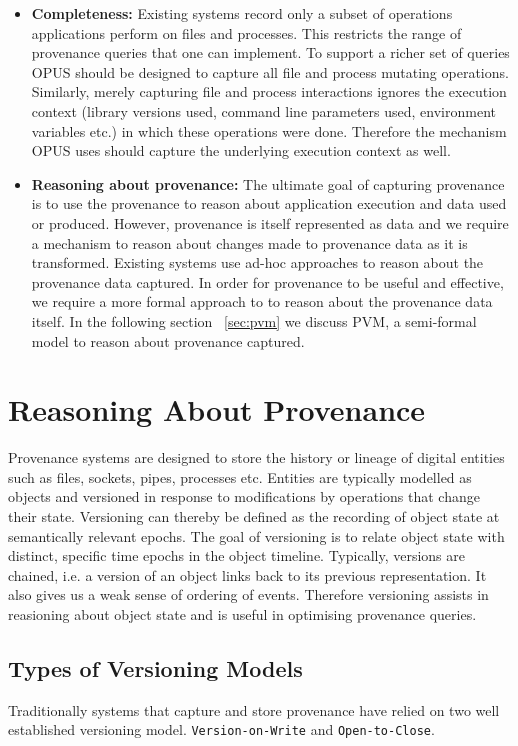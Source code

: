 \documentclass[withindex,glossary]{cam-thesis}
\begin{document}
\begin{itemize}
\item \textbf{Completeness:} 
Existing systems record only a subset of operations applications perform on files and processes. This restricts the range of provenance queries that one can implement. To support a richer set of queries OPUS should be designed to capture all file and process mutating operations. Similarly, merely capturing file and process interactions ignores the execution context (library versions used, command line parameters used, environment variables etc.) in which these operations were done. Therefore the mechanism OPUS uses should capture the underlying execution context as well. 

\item \textbf{Reasoning about provenance:}
The ultimate goal of capturing provenance is to use the provenance to reason about application execution and data used or produced. However, provenance is itself represented as data and we require a mechanism to reason about changes made to provenance data as it is transformed. Existing systems use ad-hoc approaches to reason about the provenance data captured. In order for provenance to be useful and effective, we require a more formal approach to to reason about the provenance data itself. In the following section ~\ref{sec:pvm} we discuss PVM, a semi-formal model to reason about provenance captured.

\end{itemize}

\section{Reasoning About Provenance}
Provenance systems are designed to store the history or lineage of digital entities such as files, sockets, pipes, processes etc.
Entities are typically modelled as objects and versioned in response to modifications by operations that change their state.
Versioning can thereby be defined as the recording of object state at semantically relevant epochs.
The goal of versioning is to relate object state with distinct, specific time epochs in the object timeline.
Typically, versions are chained, i.e. a version of an object links back to its previous representation.
It also gives us a weak sense of ordering of events.
Therefore versioning assists in reasioning about object state and is useful in optimising provenance queries.

\subsection{Types of Versioning Models}
Traditionally systems that capture and store provenance have relied on two well established versioning model.
\texttt{Version-on-Write} and \texttt{Open-to-Close}.
\end{document}
